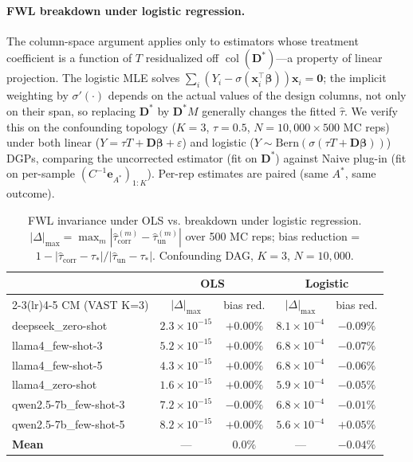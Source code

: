 \paragraph{FWL breakdown under logistic regression.}
\label{sec:fwl_logistic}
The column-space argument applies only to estimators whose treatment coefficient is a function of $T$ residualized off $\operatorname{col}(\mathbf{D}^*)$---a property of linear projection. The logistic MLE solves $\sum_i (Y_i - \sigma(\mathbf{x}_i^\top\boldsymbol{\beta}))\mathbf{x}_i = \mathbf{0}$; the implicit weighting by $\sigma'(\cdot)$ depends on the actual values of the design columns, not only on their span, so replacing $\mathbf{D}^*$ by $\mathbf{D}^* M$ generally changes the fitted $\hat\tau$. We verify this on the confounding topology ($K{=}3$, $\tau{=}0.5$, $N{=}10{,}000\times 500$ MC reps) under both linear ($Y = \tau T + \mathbf{D}\boldsymbol{\beta}+\varepsilon$) and logistic ($Y\sim\mathrm{Bern}(\sigma(\tau T + \mathbf{D}\boldsymbol{\beta}))$) DGPs, comparing the uncorrected estimator (fit on $\mathbf{D}^*$) against Naive plug-in (fit on per-sample $(C^{-1}\mathbf{e}_{A^*})_{1:K}$). Per-rep estimates are paired (same $A^*$, same outcome).

\begin{table}[h]
\centering
\small
\caption{FWL invariance under OLS vs. breakdown under logistic regression. $|\Delta|_{\max}=\max_m|\hat\tau_{\mathrm{corr}}^{(m)}-\hat\tau_{\mathrm{un}}^{(m)}|$ over 500 MC reps; bias reduction = $1-|\hat\tau_{\mathrm{corr}}-\tau_*|/|\hat\tau_{\mathrm{un}}-\tau_*|$. Confounding DAG, $K{=}3$, $N{=}10{,}000$.}
\label{tab:fwl_logistic}
\begin{tabular}{lcccc}
\toprule
 & \multicolumn{2}{c}{\textbf{OLS}} & \multicolumn{2}{c}{\textbf{Logistic}} \\
\cmidrule(lr){2-3}\cmidrule(lr){4-5}
CM (VAST K=3) & $|\Delta|_{\max}$ & bias red. & $|\Delta|_{\max}$ & bias red. \\
\midrule
deepseek\_zero-shot     & $2.3\!\times\!10^{-15}$ & $+0.00\%$ & $8.1\!\times\!10^{-4}$ & $-0.09\%$ \\
llama4\_few-shot-3      & $5.2\!\times\!10^{-15}$ & $+0.00\%$ & $6.8\!\times\!10^{-4}$ & $-0.07\%$ \\
llama4\_few-shot-5      & $4.3\!\times\!10^{-15}$ & $+0.00\%$ & $6.8\!\times\!10^{-4}$ & $-0.06\%$ \\
llama4\_zero-shot       & $1.6\!\times\!10^{-15}$ & $+0.00\%$ & $5.9\!\times\!10^{-4}$ & $-0.05\%$ \\
qwen2.5-7b\_few-shot-3  & $7.2\!\times\!10^{-15}$ & $-0.00\%$ & $6.8\!\times\!10^{-4}$ & $-0.01\%$ \\
qwen2.5-7b\_few-shot-5  & $8.2\!\times\!10^{-15}$ & $+0.00\%$ & $5.6\!\times\!10^{-4}$ & $+0.05\%$ \\
\midrule
\textbf{Mean}           & ---                     & $\mathbf{0.0\%}$ & ---            & $\mathbf{-0.04\%}$ \\
\bottomrule
\end{tabular}
\end{table}

